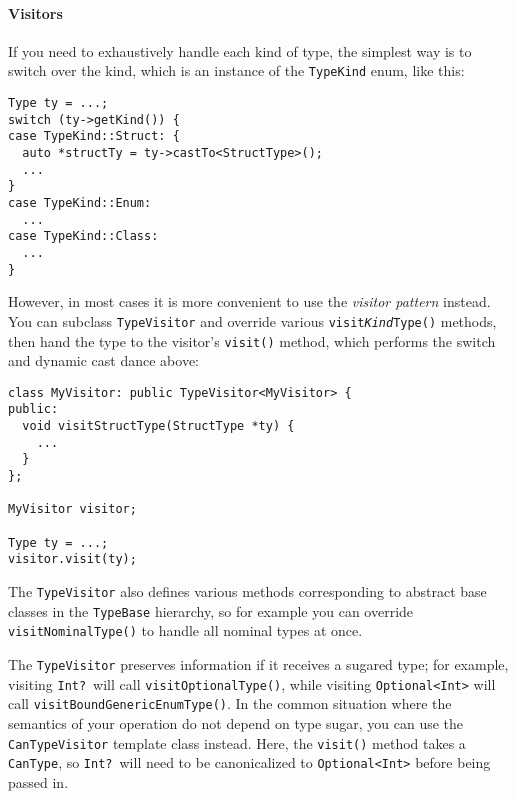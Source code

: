 \documentclass[a4paper,headsepline,bibliography=totoc,toc=flat,fleqn,twoside=semi]{scrbook}
\theoremstyle{definition}
\theoremstyle{definition}
\theoremstyle{definition}
\begin{document}
\paragraph{Visitors}
If you need to exhaustively handle each kind of type, the simplest way is to switch over the kind, which is an instance of the \texttt{TypeKind} enum, like this:
\begin{Verbatim}
Type ty = ...;
switch (ty->getKind()) {
case TypeKind::Struct: {
  auto *structTy = ty->castTo<StructType>();
  ...
}
case TypeKind::Enum:
  ...
case TypeKind::Class:
  ...
}
\end{Verbatim}
However, in most cases it is more convenient to use the \emph{visitor pattern} instead. You can subclass \texttt{TypeVisitor} and override various \texttt{visit\emph{Kind}Type()} methods, then hand the type to the visitor's \texttt{visit()} method, which performs the switch and dynamic cast dance above:
\begin{Verbatim}
class MyVisitor: public TypeVisitor<MyVisitor> {
public:
  void visitStructType(StructType *ty) {
    ...
  }
};

MyVisitor visitor;

Type ty = ...;
visitor.visit(ty);
\end{Verbatim}
The \texttt{TypeVisitor} also defines various methods corresponding to abstract base classes in the \texttt{TypeBase} hierarchy, so for example you can override \texttt{visitNominalType()} to handle all nominal types at once.

The \texttt{TypeVisitor} preserves information if it receives a sugared type; for example, visiting \texttt{Int?}\ will call \texttt{visitOptionalType()}, while visiting \texttt{Optional<Int>} will call \texttt{visitBoundGenericEnumType()}. In the common situation where the semantics of your operation do not depend on type sugar, you can use the \texttt{CanTypeVisitor} template class instead. Here, the \texttt{visit()} method takes a \texttt{CanType}, so \texttt{Int?}\ will need to be canonicalized to \texttt{Optional<Int>} before being passed in.
\end{document}
